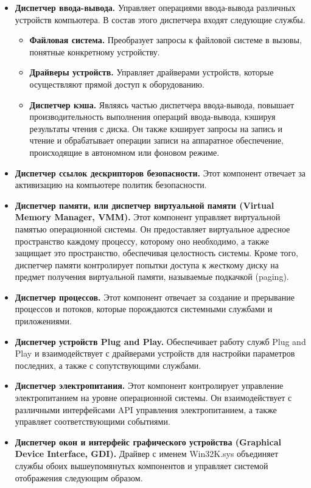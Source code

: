 \begin{itemize}
\item \textbf{Диспетчер ввода-вывода.} Управляет операциями ввода-вывода различных устройств компьютера. В состав этого диспетчера входят следующие службы.
\begin{itemize}
\item \textbf{Файловая система.} Преобразует запросы к файловой системе в вызовы, понятные конкретному устройству.
\item \textbf{Драйверы устройств.} Управляет драйверами устройств, которые осуществляют прямой доступ к оборудованию.
\item \textbf{Диспетчер кэша.} Являясь частью диспетчера ввода-вывода, повышает производительность выполнения операций ввода-вывода, кэшируя результаты чтения с диска. Он также кэширует запросы на запись и чтение и обрабатывает операции записи на аппаратное обеспечение, происходящие в автономном или фоновом режиме.
\end{itemize}
\item \textbf{Диспетчер ссылок дескрипторов безопасности.} Этот компонент отвечает за активизацию на компьютере политик безопасности.
\item \textbf{Диспетчер памяти, или диспетчер виртуальной памяти (Virtual Memory Manager, VMM).} Этот компонент управляет виртуальной памятью операционной системы. Он предоставляет виртуальное адресное пространство каждому процессу, которому оно необходимо, а также защищает это пространство, обеспечивая целостность системы. Кроме того, диспетчер памяти контролирует попытки доступа к жесткому диску на предмет получения виртуальной памяти, называемые подкачкой (paging).
\item \textbf{Диспетчер процессов.} Этот компонент отвечает за создание и прерывание процессов и потоков, которые порождаются системными службами и приложениями.
\item \textbf{Диспетчер устройств Plug and Play.} Обеспечивает работу служб Plug and Play и взаимодействует с драйверами устройств для настройки параметров последних, а также с сопутствующими службами.
\item \textbf{Диспетчер электропитания.} Этот компонент контролирует управление электропитанием на уровне операционной системы. Он взаимодействует с различными интерфейсами API управления электропитанием, а также управляет соответствующими событиями.
\item \textbf{Диспетчер окон и интерфейс графического устройства (Graphical Device Interface, GDI).} Драйвер с именем Win32K.sys объединяет службы обоих вышеупомянутых компонентов и управляет системой отображения следующим образом.

\end{itemize}
